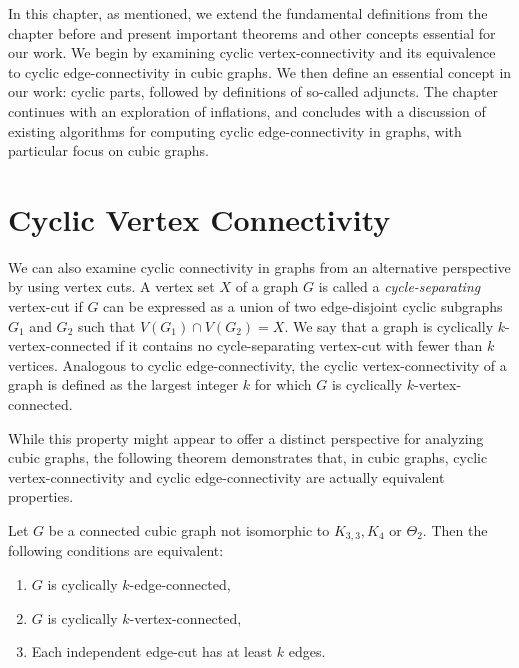 \documentclass[12pt, twoside]{book}
\begin{document}
In this chapter, as mentioned, we extend the fundamental definitions from the chapter before and present important theorems and other concepts essential for our work. We begin by examining cyclic vertex-connectivity and its equivalence to cyclic edge-connectivity in cubic graphs. We then define an essential concept in our work: cyclic parts, followed by definitions of so-called adjuncts. The chapter continues with an exploration of inflations, and concludes with a discussion of existing algorithms for computing cyclic edge-connectivity in graphs, with particular focus on cubic graphs.

\section{Cyclic Vertex Connectivity}

We can also examine cyclic connectivity in graphs from an alternative perspective by using vertex cuts. A vertex set $X$ of a graph $G$ is called a \mbox{\textit{cycle-separating}} vertex-cut if $G$ can be expressed as a union
of two edge-disjoint cyclic subgraphs $G_1$ and $G_2$ such that $V(G_1) \cap V(G_2) = X$. We say that a graph is cyclically \mbox{$k$-vertex-connected} if it contains no cycle-separating vertex-cut with fewer than $k$ vertices. Analogous to cyclic \mbox{edge-connectivity}, the cyclic \mbox{vertex-connectivity} of a graph is defined as the largest integer $k$ for which $G$ is cyclically \mbox{$k$-vertex-connected}.

While this property might appear to offer a distinct perspective for analyzing cubic graphs, the following theorem demonstrates that, in cubic graphs, cyclic vertex-connectivity and cyclic edge-connectivity are actually equivalent properties.

\begin{theorem}\label{th:cyclic-vertex-edge-independent-equivalence}
	Let $G$ be a connected cubic graph not isomorphic to $K_{3,3},K_4$ or $\Theta_2$. Then the following conditions are equivalent:
	\begin{enumerate}
		\item $G$ is cyclically $k$-edge-connected,
		\item $G$ is cyclically $k$-vertex-connected,
		\item Each independent edge-cut has at least $k$ edges.
	\end{enumerate}
\end{theorem}
\end{document}
